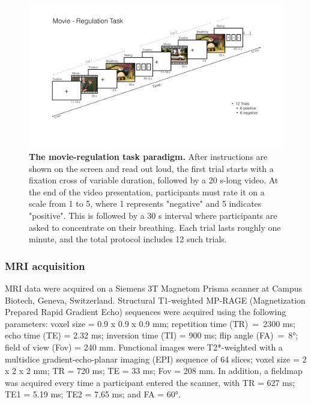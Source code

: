 \begin{figure}[h]
\centering
\includegraphics[width=1\textwidth]{images/Ch5/Ch5_movieRegTask.pdf}
\vspace*{5mm}
\caption{\textbf{The movie-regulation task paradigm. } After instructions are shown on the screen and read out loud, the first trial starts with a fixation cross of variable duration, followed by a 20 s-long video. At the end of the video presentation, participants must rate it on a scale from 1 to 5, where 1 represents "negative" and 5 indicates "positive". This is followed by a 30 s interval where participants are asked to concentrate on their breathing. Each trial lasts roughly one minute, and the total protocol includes 12 such trials.  }
\label{fig:videoReg_task} 
\end{figure}










\subsubsection{MRI acquisition} 
MRI data were acquired on a Siemens 3T Magnetom Prisma scanner at Campus Biotech, Geneva, Switzerland. Structural T1-weighted MP-RAGE (Magnetization Prepared Rapid Gradient Echo) sequences were acquired using the following parameters: voxel size = 0.9 x 0.9 x 0.9 mm; repetition time (TR)~=~2300 ms; echo time (TE) = 2.32 ms; inversion time (TI) = 900 ms; flip angle (FA)~=~8°; field of view (Fov) = 240 mm. Functional images were T2*-weighted with a multislice gradient-echo-planar imaging (EPI) sequence of 64 slices; voxel size = 2 x 2 x 2 mm; TR = 720 ms; TE = 33 ms; Fov = 208 mm. In addition, a fieldmap was acquired every time a participant entered the scanner, with TR = 627 ms; TE1 = 5.19 ms; TE2 = 7.65 ms; and FA = 60°.

